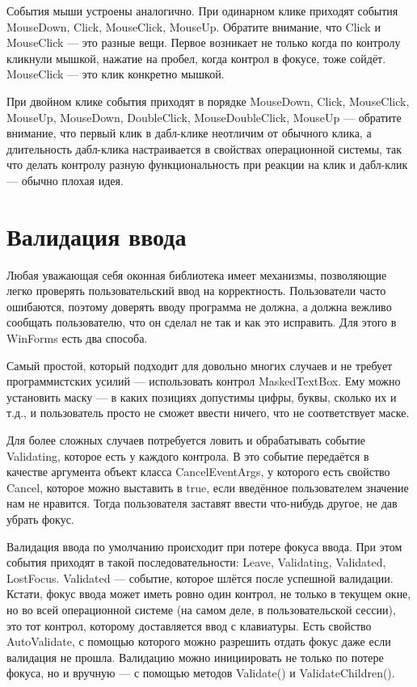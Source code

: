 \documentclass[a5paper]{article}
\begin{document}
События мыши устроены аналогично. При одинарном клике приходят события MouseDown, Click, MouseClick, MouseUp. Обратите внимание, что Click и MouseClick --- это разные вещи. Первое возникает не только когда по контролу кликнули мышкой, нажатие на пробел, когда контрол в фокусе, тоже сойдёт. MouseClick --- это клик конкретно мышкой.

При двойном клике события приходят в порядке MouseDown, Click, MouseClick, MouseUp, MouseDown, DoubleClick, MouseDoubleClick, MouseUp --- обратите внимание, что первый клик в дабл-клике неотличим от обычного клика, а длительность дабл-клика настраивается в свойствах операционной системы, так что делать контролу разную функциональность при реакции на клик и дабл-клик --- обычно плохая идея.

\section{Валидация ввода}

Любая уважающая себя оконная библиотека имеет механизмы, позволяющие легко проверять пользовательский ввод на корректность. Пользователи часто ошибаются, поэтому доверять вводу программа не должна, а должна вежливо сообщать пользователю, что он сделал не так и как это исправить. Для этого в WinForms есть два способа. 

Самый простой, который подходит для  довольно многих случаев и не требует программистских усилий --- использовать контрол MaskedTextBox. Ему можно установить маску --- в каких позициях допустимы цифры, буквы, сколько их  и т.д., и пользователь просто не сможет ввести ничего, что не соответствует маске.

Для более сложных случаев потребуется ловить и обрабатывать событие Validating, которое есть у каждого контрола. В это событие передаётся в качестве аргумента объект класса CancelEventArgs, у которого есть свойство Cancel, которое можно выставить в true, если введённое пользователем значение нам не нравится. Тогда пользователя заставят ввести что-нибудь другое, не дав убрать фокус.

Валидация ввода по умолчанию происходит при потере фокуса ввода. При этом события приходят в такой последовательности:  Leave, Validating, Validated, LostFocus. Validated --- событие, которое шлётся после успешной валидации. Кстати, фокус ввода может иметь ровно один контрол, не только в текущем окне, но во всей операционной системе (на самом деле, в пользовательской сессии), это тот контрол, которому доставляется ввод с клавиатуры. Есть свойство AutoValidate, с помощью которого можно разрешить отдать фокус даже если валидация не прошла. Валидацию можно инициировать не только по потере фокуса, но и вручную --- с помощью методов Validate() и ValidateChildren().
\end{document}
